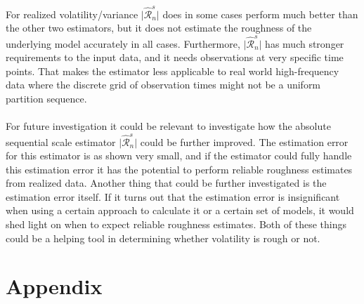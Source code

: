 \documentclass{article}
\begin{document}
For realized volatility/variance $\lvert \widehat{\mathscr{R}}_n^s \rvert$ does in some cases perform much better than the other two estimators, but it does not estimate the roughness of the underlying model accurately in all cases. Furthermore, $\lvert \widehat{\mathscr{R}}_n^s \rvert$ has much stronger requirements to the input data, and it needs observations at very specific time points. That makes the estimator less applicable to real world high-frequency data where the discrete grid of observation times might not be a uniform partition sequence.\\\\
For future investigation it could be relevant to investigate how the absolute sequential scale estimator $\lvert \widehat{\mathscr{R}}_n^s \rvert$ could be further improved. The estimation error for this estimator is as shown very small, and if the estimator could fully handle this estimation error it has the potential to perform reliable roughness estimates from realized data. Another thing that could be further investigated is the estimation error itself. If it turns out that the estimation error is insignificant when using a certain approach to calculate it or a certain set of models, it would shed light on when to expect reliable roughness estimates. Both of these things could be a helping tool in determining whether volatility is rough or not.

\newpage
\section{Appendix}
\end{document}
